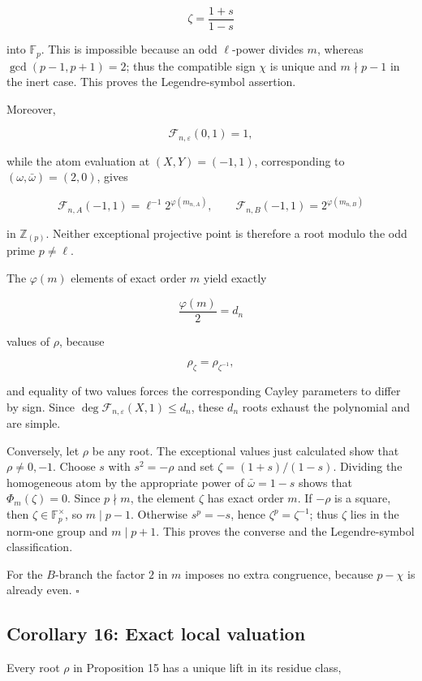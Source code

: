 \documentclass[11pt]{article}
\begin{document}
\[
\zeta
=
\frac{1+s}{1-s}
\]

into \(\mathbb F_p\). This is impossible because an odd \(\ell\)-power
divides \(m\), whereas \(\gcd(p-1,p+1)=2\); thus the compatible sign
\(\chi\) is unique and \(m\nmid p-1\) in the inert case. This proves the
Legendre-symbol assertion.

Moreover,

\[
\mathcal F_{n,\varepsilon}(0,1)=1,
\]

while the atom evaluation at
\((X,Y)=(-1,1)\), corresponding to \((\omega,\bar\omega)=(2,0)\), gives

\[
\mathcal F_{n,A}(-1,1)
=
\ell^{-1}2^{\varphi(m_{n,A})},
\qquad
\mathcal F_{n,B}(-1,1)
=
2^{\varphi(m_{n,B})}
\]

in \(\mathbb Z_{(p)}\). Neither exceptional projective point is therefore
a root modulo the odd prime \(p\ne\ell\).

The \(\varphi(m)\) elements of exact order \(m\) yield exactly

\[
\frac{\varphi(m)}2=d_n
\]

values of \(\rho\), because

\[
\rho_\zeta=\rho_{\zeta^{-1}},
\]

and equality of two values forces the corresponding Cayley parameters to
differ by sign. Since
\(\deg\mathcal F_{n,\varepsilon}(X,1)\leq d_n\), these \(d_n\) roots
exhaust the polynomial and are simple.

Conversely, let \(\rho\) be any root. The exceptional values just
calculated show that \(\rho\ne0,-1\). Choose \(s\) with
\(s^2=-\rho\) and set \(\zeta=(1+s)/(1-s)\). Dividing the homogeneous
atom by the appropriate power of \(\bar\omega=1-s\) shows that
\(\Phi_m(\zeta)=0\). Since \(p\nmid m\), the element \(\zeta\) has exact
order \(m\). If \(-\rho\) is a square, then
\(\zeta\in\mathbb F_p^\times\), so \(m\mid p-1\). Otherwise
\(s^p=-s\), hence \(\zeta^p=\zeta^{-1}\); thus \(\zeta\) lies in the
norm-one group and \(m\mid p+1\). This proves the converse and the
Legendre-symbol classification.

For the \(B\)-branch the factor \(2\) in \(m\) imposes no extra
congruence, because \(p-\chi\) is already even. \(\square\)

\subsection{Corollary 16: Exact local valuation}

Every root \(\rho\) in Proposition 15 has a unique lift in its residue
class,
\end{document}
